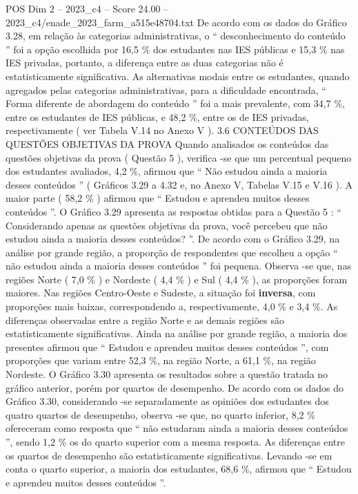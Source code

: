 \begin{textsample}{POS Dim 2 – 2023\_c4 – Score 24.00 – 2023\_c4/enade\_2023\_farm\_a515e48704.txt}
De acordo com os dados do Gráfico 3.28, em relação às categorias administrativas, o “ desconhecimento do conteúdo ” foi a opção escolhida por 16,5 \% dos estudantes nas IES públicas e 15,3 \% nas IES privadas, portanto, a diferença entre as duas categorias não é estatisticamente significativa.
As alternativas modais entre os estudantes, quando agregados pelas categorias administrativas, para a dificuldade encontrada, “ Forma diferente de abordagem do conteúdo ” foi a mais prevalente, com 34,7 \%, entre os estudantes de IES públicas, e 48,2 \%, entre os de IES privadas, respectivamente ( ver Tabela V.14 no Anexo V ). 3.6 CONTEÚDOS DAS QUESTÕES OBJETIVAS DA PROVA Quando analisados os conteúdos das questões objetivas da prova ( Questão 5 ), verifica -se que um percentual pequeno dos estudantes avaliados, 4,2 \%, afirmou que “ Não estudou ainda a maioria desses conteúdos ” ( Gráficos 3.29 a 4.32 e, no Anexo V, Tabelas V.15 e V.16 ).
A maior parte ( 58,2 \% ) afirmou que “ Estudou e aprendeu muitos desses conteúdos ”.
O Gráfico 3.29 apresenta as respostas obtidas para a Questão 5 : “ Considerando apenas as questões objetivas da prova, você percebeu que não estudou ainda a maioria desses conteúdos? ”.
De acordo com o Gráfico 3.29, na análise por grande região, a proporção de respondentes que escolheu a opção “ não estudou ainda a maioria desses conteúdos ” foi pequena.
Observa -se que, nas regiões Norte ( 7,0 \% ) e Nordeste ( 4,4 \% ) e Sul ( 4,4 \% ), as proporções foram maiores.
Nas regiões Centro-Oeste e Sudeste, a situação foi \textbf{inversa}, com proporções mais baixas, correspondendo a, respectivamente, 4,0 \% e 3,4 \%.
As diferenças observadas entre a região Norte e as demais regiões são estatisticamente significativas.
Ainda na análise por grande região, a maioria dos presentes afirmou que “ Estudou e aprendeu muitos desses conteúdos ”, com proporções que variam entre 52,3 \%, na região Norte, a 61,1 \%, na região Nordeste.
O Gráfico 3.30 apresenta os resultados sobre a questão tratada no gráfico anterior, porém por quartos de desempenho.
De acordo com os dados do Gráfico 3.30, considerando -se separadamente as opiniões dos estudantes dos quatro quartos de desempenho, observa -se que, no quarto inferior, 8,2 \% ofereceram como resposta que “ não estudaram ainda a maioria desses conteúdos ”, sendo 1,2 \% os do quarto superior com a mesma resposta.
As diferenças entre os quartos de desempenho são estatisticamente significativas.
Levando -se em conta o quarto superior, a maioria dos estudantes, 68,6 \%, afirmou que “ Estudou e aprendeu muitos desses conteúdos ”.

\end{textsample}
